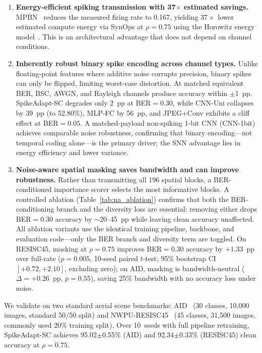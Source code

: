\documentclass[conference]{IEEEtran}
\begin{document}
\begin{enumerate}
    \item \textbf{Energy-efficient spiking transmission with 37$\times$ estimated savings.} MPBN~\cite{guo2023mpbn} reduces the measured firing rate to 0.167, yielding $37{\times}$ lower estimated compute energy via SynOps at $\rho{=}0.75$ using the Horowitz energy model~\cite{horowitz2014energy}. This is an architectural advantage that does not depend on channel conditions.
    
    \item \textbf{Inherently robust binary spike encoding across channel types.} Unlike floating-point features where additive noise corrupts precision, binary spikes can only be flipped, limiting worst-case distortion. At matched equivalent BER, BSC, AWGN, and Rayleigh channels produce accuracy within $\pm$1~pp. SpikeAdapt-SC degrades only 2~pp at BER${=}0.30$, while CNN-Uni collapses by 39~pp (to 52.80\%), MLP-FC by 56~pp, and JPEG+Conv exhibits a cliff effect at BER${=}0.05$. A matched-payload non-spiking 1-bit CNN (CNN-1bit) achieves comparable noise robustness, confirming that binary encoding---not temporal coding alone---is the primary driver; the SNN advantage lies in energy efficiency and lower variance.
    
    \item \textbf{Noise-aware spatial masking saves bandwidth and can improve robustness.} Rather than transmitting all 196 spatial blocks, a BER-conditioned importance scorer selects the most informative blocks. A controlled ablation (Table~\ref{tab:na_ablation}) confirms that both the BER-conditioning branch and the diversity loss are essential: removing either drops BER${=}0.30$ accuracy by $\sim$20--45~pp while leaving clean accuracy unaffected. All ablation variants use the identical training pipeline, backbone, and evaluation code---only the BER branch and diversity term are toggled. On RESISC45, masking at $\rho{=}0.75$ improves BER${=}0.30$ accuracy by $+$1.33~pp over full-rate ($p{=}0.005$, 10-seed paired $t$-test; 95\% bootstrap CI $[+0.72, +2.10]$, excluding zero); on AID, masking is bandwidth-neutral ($\Delta{=}+$0.26~pp, $p{=}0.55$), saving 25\% bandwidth with no accuracy loss under noise.
\end{enumerate}

We validate on two standard aerial scene benchmarks: AID~\cite{xia2017aid} (30 classes, 10,000 images, standard 50/50 split) and NWPU-RESISC45~\cite{cheng2017resisc} (45 classes, 31,500 images, commonly used 20\% training split). Over 10~seeds with full pipeline retraining, SpikeAdapt-SC achieves 95.02$\pm$0.55\% (AID) and 92.34$\pm$0.33\% (RESISC45) clean accuracy at $\rho{=}0.75$.
\end{document}
